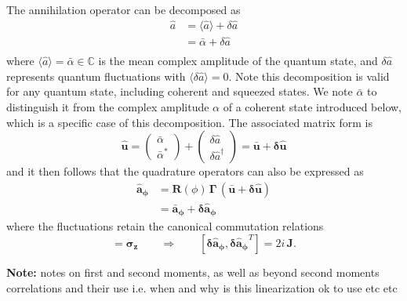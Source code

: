 The annihilation operator can be decomposed as
\begin{equation}
\begin{split}
    \hat{a} & = \langle \hat{a} \rangle + \delta\hat{a}\\
    & = \bar{\alpha} + \delta\hat{a} \\
\end{split}
\label{II.8}
\end{equation}
where \(\langle \hat{a} \rangle = \bar{\alpha} \in \mathbb{C}\) is the mean complex amplitude of the quantum state, and \(\delta\hat{a}\) represents quantum fluctuations with \(\langle \delta\hat{a}\rangle = 0\). Note this decomposition is valid for any quantum state, including coherent and squeezed states. We note $\bar{\alpha}$ to distinguish it from the complex amplitude $\alpha$ of a coherent state introduced below, which is a specific case of this decomposition. The associated matrix form is 
\begin{equation}
\mathbf{\hat{u}} =  \begin{pmatrix} \bar{\alpha}  \\ \bar{\alpha}^*  \end{pmatrix} + \begin{pmatrix} \delta\hat{a} \\ \delta\hat{a}^\dagger \end{pmatrix} =  \mathbf{\bar{u}} + \mathbf{\delta \hat{u}}
\end{equation}
and it then follows that the quadrature operators can also be expressed as
\begin{equation}
  \begin{split}
    \mathbf{\hat{a}_\phi} & = \mathbf{R}(\phi) \, \mathbf\Gamma  \,(\mathbf{\bar{u}} + \mathbf{\delta \hat{u}}) \\
    & = \mathbf{\bar{a}_\phi}  + \mathbf{\delta \hat{a}_\phi} 
  \end{split}
\end{equation}
where the fluctuations retain the canonical commutation relations
\begin{equation}
[\mathbf{\delta \hat{u}}, \mathbf{\delta \hat{u}}^{\dagger}] = \mathbf{\sigma_z} \qquad \Rightarrow \qquad
[\mathbf{\delta \hat{a}_\phi}, \mathbf{\delta \hat{a}_\phi}^{T}] = 2i\,\mathbf{J}.
\label{II.11}
\end{equation}

\noindent \textbf{Note:} \color{red} notes on first and second moments, as well as beyond second moments correlations and their use i.e. when and why is this linearization ok to use etc etc \color{black}

